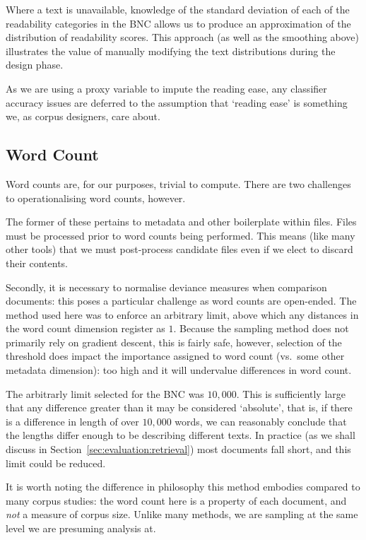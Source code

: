 Where a text is unavailable, knowledge of the standard deviation of each of the readability categories in the BNC allows us to produce an approximation of the distribution of readability scores.  This approach (as well as the smoothing above) illustrates the value of manually modifying the text distributions during the design phase.

As we are using a proxy variable to impute the reading ease, any classifier accuracy issues are deferred to the assumption that `reading ease' is something we, as corpus designers, care about.






\subsection{Word Count}
Word counts are, for our purposes, trivial to compute.  There are two challenges to operationalising word counts, however.

The former of these pertains to metadata and other boilerplate within files.  Files must be processed prior to word counts being performed.  This means (like many other tools) that we must post-process candidate files even if we elect to discard their contents.

Secondly, it is necessary to normalise deviance measures when comparison documents: this poses a particular challenge as word counts are open-ended.  The method used here was to enforce an arbitrary limit, above which any distances in the word count dimension register as $1$.  Because the sampling method does not primarily rely on gradient descent, this is fairly safe, however, selection of the threshold does impact the importance assigned to word count (vs.\ some other metadata dimension): too high and it will undervalue differences in word count.

The arbitrarly limit selected for the BNC was $10,000$.  This is sufficiently large that any difference greater than it may be considered `absolute', that is, if there is a difference in length of over $10,000$ words, we can reasonably conclude that the lengths differ enough to be describing different texts.  In practice (as we shall discuss in Section~\ref{sec:evaluation:retrieval}) most documents fall short, and this limit could be reduced.

It is worth noting the difference in philosophy this method embodies compared to many corpus studies: the word count here is a property of each document, and \textsl{not} a measure of corpus size.  Unlike many methods, we are sampling at the same level we are presuming analysis at.







